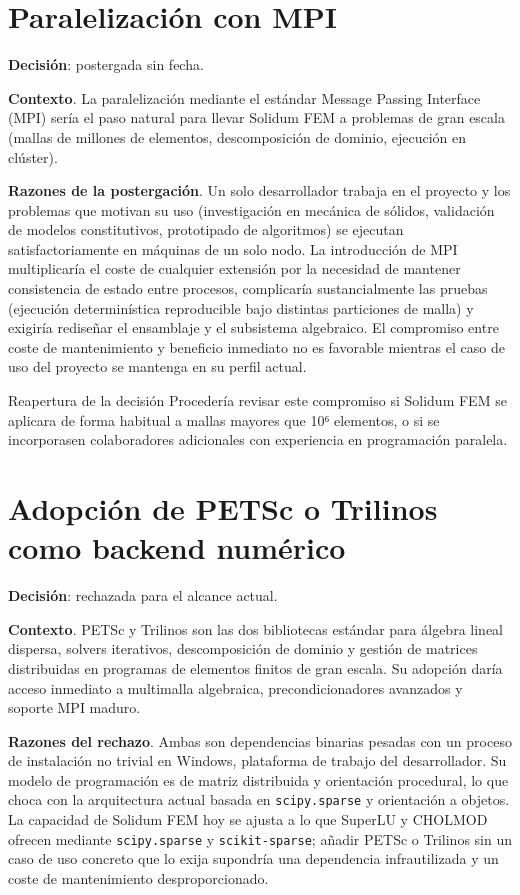 \documentclass[11pt,oneside]{report}
\begin{document}
\section{Paralelización con MPI}

\textbf{Decisión}: postergada sin fecha.

\textbf{Contexto}. La paralelización mediante el estándar Message Passing Interface (MPI) sería el paso natural para llevar Solidum FEM a problemas de gran escala (mallas de millones de elementos, descomposición de dominio, ejecución en clúster).

\textbf{Razones de la postergación}. Un solo desarrollador trabaja en el proyecto y los problemas que motivan su uso (investigación en mecánica de sólidos, validación de modelos constitutivos, prototipado de algoritmos) se ejecutan satisfactoriamente en máquinas de un solo nodo. La introducción de MPI multiplicaría el coste de cualquier extensión por la necesidad de mantener consistencia de estado entre procesos, complicaría sustancialmente las pruebas (ejecución determinística reproducible bajo distintas particiones de malla) y exigiría rediseñar el ensamblaje y el subsistema algebraico. El compromiso entre coste de mantenimiento y beneficio inmediato no es favorable mientras el caso de uso del proyecto se mantenga en su perfil actual.

\begin{infobox}{Reapertura de la decisión}
Procedería revisar este compromiso si Solidum FEM se aplicara de forma habitual a mallas mayores que 10⁶ elementos, o si se incorporasen colaboradores adicionales con experiencia en programación paralela.
\end{infobox}

\section{Adopción de PETSc o Trilinos como backend numérico}

\textbf{Decisión}: rechazada para el alcance actual.

\textbf{Contexto}. PETSc y Trilinos son las dos bibliotecas estándar para álgebra lineal dispersa, solvers iterativos, descomposición de dominio y gestión de matrices distribuidas en programas de elementos finitos de gran escala. Su adopción daría acceso inmediato a multimalla algebraica, precondicionadores avanzados y soporte MPI maduro.

\textbf{Razones del rechazo}. Ambas son dependencias binarias pesadas con un proceso de instalación no trivial en Windows, plataforma de trabajo del desarrollador. Su modelo de programación es de matriz distribuida y orientación procedural, lo que choca con la arquitectura actual basada en \texttt{scipy.sparse} y orientación a objetos. La capacidad de Solidum FEM hoy se ajusta a lo que SuperLU y CHOLMOD ofrecen mediante \texttt{scipy.sparse} y \texttt{scikit-sparse}; añadir PETSc o Trilinos sin un caso de uso concreto que lo exija supondría una dependencia infrautilizada y un coste de mantenimiento desproporcionado.
\end{document}

